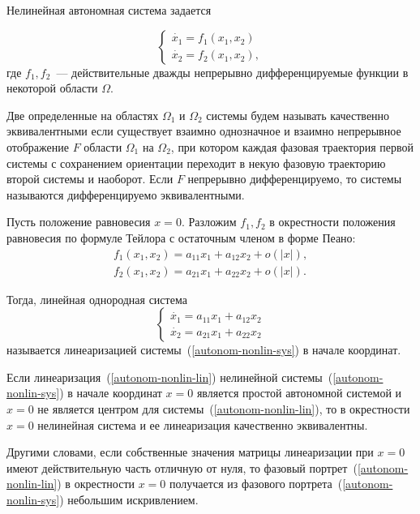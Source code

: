 Нелинейная автономная система задается

\begin{equation}\label{autonom-nonlin-sys}
    \begin{cases}
    \dot{x_1} = f_1(x_1, x_2)\\
    \dot{x_2} = f_2(x_1, x_2),
    \end{cases}
\end{equation}
где $f_1, f_2$~--- действительные дважды непрерывно дифференцируемые функции в некоторой области $\Omega$.

\begin{definition}
Две определенные на областях $\Omega_1$ и $\Omega_2$ системы будем называть качественно эквивалентными если существует взаимно однозначное и взаимно непрерывное отображение $F$ области $\Omega_1$ на $\Omega_2$, при котором каждая фазовая траектория первой системы с сохранением ориентации переходит в некую фазовую траекторию второй системы и наоборот. Если $F$ непрерывно дифференцируемо, то системы называются дифференцируемо эквивалентными.
\end{definition}

Пусть положение равновесия $x=0$. Разложим $f_1, f_2$ в окрестности положения равновесия по формуле Тейлора с остаточным членом в форме Пеано:
\begin{align*}
    f_1(x_1, x_2) = a_{11} x_1 + a_{12} x_2 + o(|x|),\\
    f_2(x_1, x_2) = a_{21} x_1 + a_{22} x_2 + o(|x|).
\end{align*}

Тогда, линейная однородная система 
\begin{equation}\label{autonom-nonlin-lin}
    \begin{cases}
    \dot{x_1} = a_{11} x_1 + a_{12} x_2\\
    \dot{x_2} = a_{21} x_1 + a_{22} x_2
    \end{cases}
\end{equation}
называется линеаризацией системы~(\ref{autonom-nonlin-sys}) в начале координат.

\begin{theorem}[О линеаризации (б/д)]
Если линеаризация~(\ref{autonom-nonlin-lin}) нелинейной системы~(\ref{autonom-nonlin-sys}) в начале координат $x=0$ является простой автономной системой и $x=0$ не является центром для системы~(\ref{autonom-nonlin-lin}), то в окрестности $x=0$ нелинейная система и ее линеаризация качественно эквивалентны.
\end{theorem}
Другими словами, если собственные значения матрицы линеаризации при $x=0$ имеют действительную часть отличную от нуля, то фазовый портрет~(\ref{autonom-nonlin-lin}) в окрестности $x=0$  получается из фазового портрета~(\ref{autonom-nonlin-sys}) небольшим искривлением.

